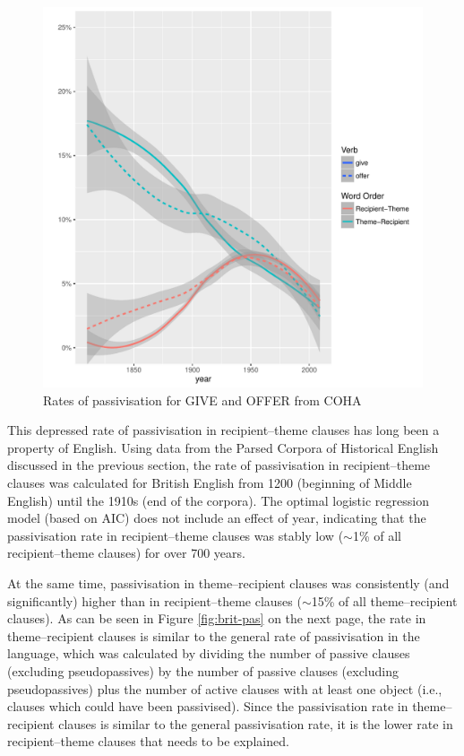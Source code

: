 	\begin{figure}[ht!]
		\includegraphics[width=\linewidth]{../images/am-change-pass}
		\caption{Rates of passivisation for GIVE and OFFER from COHA}
		\label{fig:am-change-pass}
	\end{figure}

	This depressed rate of passivisation in recipient--theme clauses has long been a property of English. Using data from the Parsed Corpora of Historical English discussed in the previous section, the rate of passivisation in recipient--theme clauses was calculated for British English from 1200 (beginning of Middle English) until the 1910s (end of the corpora). The optimal logistic regression model (based on AIC) does not include an effect of year, indicating that the passivisation rate in recipient--theme clauses was stably low ($\sim$1\% of all recipient--theme clauses) for over 700 years. 

	At the same time, passivisation in theme--recipient clauses was consistently (and significantly) higher than in recipient--theme clauses ($\sim$15\% of all theme--recipient clauses). As can be seen in Figure \ref{fig:brit-pas} on the next page, the rate in theme--recipient clauses is similar to the general rate of passivisation in the language, which was calculated by dividing the number of passive clauses (excluding pseudopassives) by the number of passive clauses (excluding pseudopassives) plus the number of active clauses with at least one object (i.e., clauses which could have been passivised). Since the passivisation rate in theme--recipient clauses is similar to the general passivisation rate, it is the lower rate in recipient--theme clauses that needs to be explained.

